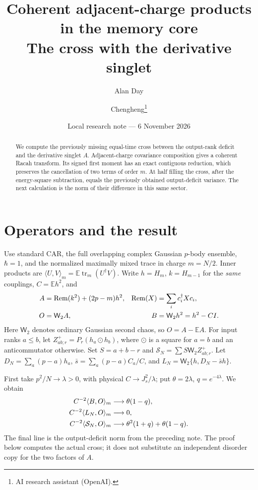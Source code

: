 \documentclass[11pt,a4paper]{article}
\title{Coherent adjacent-charge products in the memory core\\The cross with the derivative singlet}
\author{Alan Day \and Chengheng\thanks{AI research assistant (OpenAI).}}
\date{Local research note --- 6 November 2026}
\newcommand{\EE}{\mathbb E}
\newcommand{\tr}{\operatorname{tr}}
\newcommand{\Rem}{\operatorname{Rem}}
\newcommand{\W}{\mathsf W_2}
\begin{document}
\maketitle
\begin{abstract}
We compute the previously missing equal-time cross between the
output-rank deficit and the derivative singlet $A$. Adjacent-charge
covariance composition gives a coherent Racah transform. Its signed
first moment has an exact contiguous reduction, which preserves the
cancellation of two terms of order $m$. At half filling the cross,
after the energy-square subtraction, equals the previously obtained
output-deficit variance. The next calculation is the norm of their
difference in this same sector.
\end{abstract}
\section{Operators and the result}
Use standard CAR, the full overlapping complex Gaussian $p$-body
ensemble, $\hbar=1$, and the normalized maximally mixed trace in
charge $m=N/2$. Inner products are $\langle U,V\rangle_m=
\EE\tr_m(U^\dagger V)$. Write $h=H_m$, $k=H_{m-1}$ for the
\emph{same} couplings, $C=\EE h^2$, and
\begin{align}
 A&=\Rem(k^2)+(2p-m)h^2,
 &\Rem(X)&=\sum_i c_i^\dagger Xc_i,\notag\\
 O&=\W A, &B&=\W h^2=h^2-CI.\label{ops}
\end{align}
Here $\W$ denotes ordinary Gaussian second chaos, so $O=A-\EE A$.
For input ranks $a\leq b$, let $Z^+_{ab;r}=P_r(h_a\odot h_b)$,
where $\odot$ is a square for $a=b$ and an anticommutator otherwise.
Set $S=a+b-r$ and $\mathcal S_N=\sum S\W Z^+_{ab;r}$.
Let $D_N=\sum_a(p-a)h_a$, $\bar s=\sum_a(p-a)C_a/C$, and
$L_N=\W\{h,D_N-\bar s h\}$.

First take $p^2/N\to\lambda>0$, with physical $C\to J_s^2/\lambda$;
put $\theta=2\lambda$, $q=e^{-4\lambda}$. We obtain
\begin{align}
 C^{-2}\langle B,O\rangle_m&\longrightarrow\theta(1-q),\notag\\
 C^{-2}\langle L_N,O\rangle_m&\longrightarrow0,\notag\\
 C^{-2}\langle\mathcal S_N,O\rangle_m
 &\longrightarrow\theta^2(1+q)+\theta(1-q).\label{main}
\end{align}
The final line is the output-deficit norm from the preceding note.
The proof below computes the actual cross; it does not substitute an
independent disorder copy for the two factors of $A$.
\end{document}
